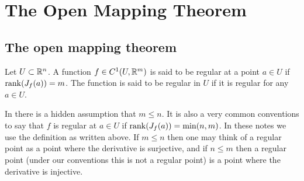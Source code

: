 \documentclass[11pt,a4paper]{article}
\begin{document}

\newpage

\section{The Open Mapping Theorem}
\subsection{The open mapping theorem}
\begin{definition}
  \label{def:regular-function}
  Let $U \subset \mathbb{R}^n$.
  A function $f \in C^1(U, \mathbb{R}^m)$ is said to be 
  regular at a point $a \in U$ if $\operatorname{rank}(J_f(a)) = m$.
  The function is said to be regular in $U$ if it is regular for any
  $a \in U$.
\end{definition}
\begin{remark}
  In  there is a hidden assumption that $m \le n$.
  It is also a very common conventions to say that $f$ is regular at $a \in U$
  if $\operatorname{rank}(J_f(a)) = \min(n,m)$.
  In these notes we use the definition as written above.
  If $m \le n$ then one may think of a regular point as a point
  where the derivative is surjective,
  and if $n \le m$ then a regular point (under our conventions
  this is not a regular point) is a point where the derivative is injective.
\end{remark}
\end{document}
